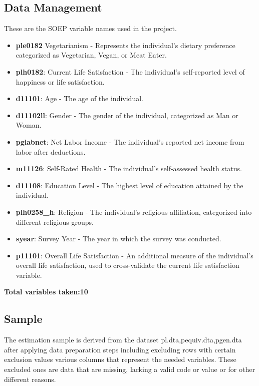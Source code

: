 \documentclass[
]{article}
\begin{document}
\subsection{Data Management}\label{data-management}

These are the SOEP variable names used in the project.

\begin{itemize}
\item
  \textbf{ple0182} Vegetarianism - Represents the individual's dietary
  preference categorized as Vegetarian, Vegan, or Meat Eater.
\item
  \textbf{plh0182}: Current Life Satisfaction - The individual's
  self-reported level of happiness or life satisfaction.
\item
  \textbf{d11101}: Age - The age of the individual.
\item
  \textbf{d11102ll}: Gender - The gender of the individual, categorized
  as Man or Woman.
\item
  \textbf{pglabnet}: Net Labor Income - The individual's reported net
  income from labor after deductions.
\item
  \textbf{m11126}: Self-Rated Health - The individual's self-assessed
  health status.
\item
  \textbf{d11108}: Education Level - The highest level of education
  attained by the individual.
\item
  \textbf{plh0258\_h}: Religion - The individual's religious
  affiliation, categorized into different religious groups.
\item
  \textbf{syear}: Survey Year - The year in which the survey was
  conducted.
\item
  \textbf{p11101}: Overall Life Satisfaction - An additional measure of
  the individual's overall life satisfaction, used to cross-validate the
  current life satisfaction variable.
\end{itemize}

\textbf{Total variables taken:10}

\subsection{Sample}\label{sample}

The estimation sample is derived from the dataset
pl.dta,pequiv.dta,pgen.dta after applying data preparation steps
including excluding rows with certain exclusion values various columns
that represent the needed variables. These excluded ones are data that
are missing, lacking a valid code or value or for other different
reasons.
\end{document}
